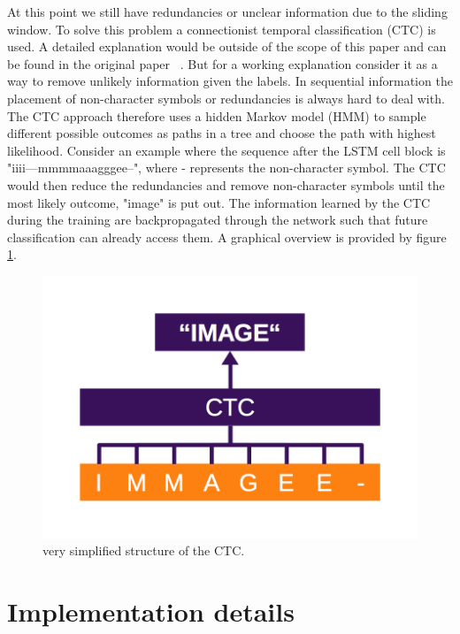 \documentclass{utue} %
\begin{document}
At this point we still have redundancies or unclear information due to the sliding window. To solve this problem a connectionist temporal classification (CTC) is used. A detailed explanation would be outside of the scope of this paper and can be found in the original paper  ~\cite{Graves:2006:CTC:1143844.1143891}.
But for a working explanation consider it as a way to remove unlikely information given the labels. In sequential information the placement of non-character symbols or redundancies is always hard to deal with. The CTC approach therefore uses a hidden Markov model (HMM) to sample different possible outcomes as paths in a tree and choose the path with highest likelihood. Consider an example where the sequence after the LSTM cell block is "iiii---mmmmaaagggee--", where - represents the non-character symbol. The CTC would then reduce the redundancies and remove non-character symbols until the most likely outcome, "image" is put out. The information learned by the CTC during the training are backpropagated through the network such that future classification can already access them. A graphical overview is provided by figure \ref{fig:structure_ctc}. \\

\begin{figure}[h!]
	\centering
	\includegraphics[width=.9\columnwidth]{graphics/model_ctc.png}
	\caption{\label{fig:structure_ctc} \footnotesize{very simplified structure of the CTC.}}
\end{figure}

\section{Implementation details}
\end{document}
